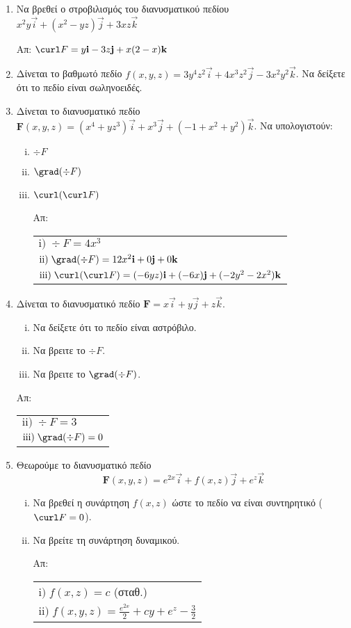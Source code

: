 \begin{enumerate}
\item Να βρεθεί ο στροβιλισμός του διανυσματικού πεδίου 
$ x^2y\vec{i}+(x^2-yz)\vec{j}+3xz\vec{k} $

\hfill Απ: $\curl F=y\vec{i}-3z\vec{j}+x(2-x)\vec{k}$

\item Δίνεται το βαθμωτό πεδίο 
  $f(x,y,z)=3y^4z^2\vec{i}+4x^3z^2\vec{j}-3x^2y^2\vec{k}$. Να δείξετε ότι το 
  πεδίο είναι σωληνοειδές.

\item Δίνεται το διανυσματικό πεδίο 
  $\boldsymbol{F}(x,y,z)=(x^4+yz^3)\vec{i}+x^3\vec{j}+(-1+x^2+y^2)\vec{k}$. 
  Να υπολογιστούν:
\begin{enumerate}[i)]
\item $\div F$
\item $\grad(\div F)$
\item $\curl(\curl F)$

\hfill Απ: \begin{tabular}{l}
  $\mathrm{i)}\; \div F=4x^3$ \\
  $\mathrm{ii)}\; \grad(\div F)=12x^2\vec{i}+0\vec{j}+0\vec{k}$ \\
  $\mathrm{iii)}\; \curl(\curl F)=(-6yz)\vec{i}+(-6x)\vec{j}+(-2y^2-2x^2)\vec{k}$
\end{tabular}

\end{enumerate}

\item Δίνεται το διανυσματικό πεδίο $\boldsymbol{F}=x\vec{i}+y\vec{j}+z\vec{k}$. 
\begin{enumerate}[i)]
\item Να δείξετε ότι το πεδίο είναι αστρόβιλο.
\item Να βρειτε το $\div F$.
\item Να βρειτε το $\grad(\div F)$.
\end{enumerate}

\hfill Απ: \begin{tabular}{l}
  $\mathrm{ii)}\; \div F=3$ \\
  $\mathrm{iii)}\; \grad(\div F)=0$

\end{tabular}

\item Θεωρούμε το διανυσματικό πεδίο
\[
\boldsymbol{F}(x,y,z)=e^{2x}\vec{i}+f(x,z)\vec{j}+e^z\vec{k}
\]
\begin{enumerate}[i)]
\item Να βρεθεί η συνάρτηση $f(x,z)$ ώστε το πεδίο να είναι συντηρητικό ($\curl F=0$).
\item Να βρείτε τη συνάρτηση δυναμικού.

\hfill Απ: \begin{tabular}{l}
  $\mathrm{i)}\; f(x,z)=c$ (σταθ.) \\
  $\mathrm{ii)}\;f(x,y,z)=\frac{e^{2x}}{2}+cy+e^z-\frac{3}{2}$
\end{tabular}

\end{enumerate}
\end{enumerate}


